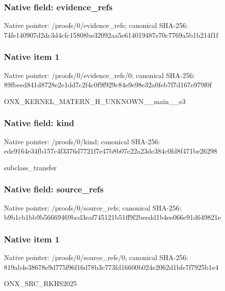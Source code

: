 \documentclass[10pt,a4paper]{article}
\begin{document}
\subsubsection{Native field: evidence\_\allowbreak{}refs}
Native pointer: /proofs/0/evidence\_\allowbreak{}refs; canonical SHA-256: 74fe140907d2dc3d4cfc15808be32092aa5e614019487e70c7769a5b1b214f1f

\subsubsection{Native item 1}
Native pointer: /proofs/0/evidence\_\allowbreak{}refs/0; canonical SHA-256: 89fbeed841d8728e2e1dd7c2f4c0f9f929c84e9e98e32a0feb7f7d167e979f0f

\begingroup\raggedright\sloppy ONX\_\allowbreak{}KERNEL\_\allowbreak{}MATERN\_\allowbreak{}H\_\allowbreak{}UNKNOWN\_\allowbreak{}\_\allowbreak{}main\_\allowbreak{}\_\allowbreak{}e3\par\endgroup

\subsubsection{Native field: kind}
Native pointer: /proofs/0/kind; canonical SHA-256: ede9164e34fb157c4f3376d7721f7e47b8b07e22a23dc384c0fd8f471be26298

\begingroup\raggedright\sloppy subclass\_\allowbreak{}transfer\par\endgroup

\subsubsection{Native field: source\_\allowbreak{}refs}
Native pointer: /proofs/0/source\_\allowbreak{}refs; canonical SHA-256: b9b1cb1bb9b56669469bcd3eaf745121b51ff9f2beedd1b4ee066e91d649821e

\subsubsection{Native item 1}
Native pointer: /proofs/0/source\_\allowbreak{}refs/0; canonical SHA-256: 819ab4e38678e9d775f96f16d78b3c773fd16600b024e2062d1bfe7f7925b1e4

\begingroup\raggedright\sloppy ONX\_\allowbreak{}SRC\_\allowbreak{}RKHS2025\par\endgroup
\end{document}
